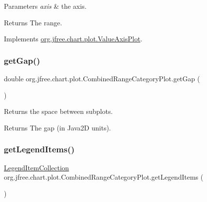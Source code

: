 \begin{DoxyParams}{Parameters}
{\em axis} & the axis.\\
\hline
\end{DoxyParams}
\begin{DoxyReturn}{Returns}
The range. 
\end{DoxyReturn}


Implements \mbox{\hyperlink{interfaceorg_1_1jfree_1_1chart_1_1plot_1_1_value_axis_plot_a54815b2f078c11b2618804fe3e7e5353}{org.\+jfree.\+chart.\+plot.\+Value\+Axis\+Plot}}.

\mbox{\label{classorg_1_1jfree_1_1chart_1_1plot_1_1_combined_range_category_plot_a5e987ea289d17c1e4a86ee61f178a53d}} 
\subsubsection{\texorpdfstring{get\+Gap()}{getGap()}}
{\footnotesize\ttfamily double org.\+jfree.\+chart.\+plot.\+Combined\+Range\+Category\+Plot.\+get\+Gap (\begin{DoxyParamCaption}{ }\end{DoxyParamCaption})}

Returns the space between subplots.

\begin{DoxyReturn}{Returns}
The gap (in Java2D units). 
\end{DoxyReturn}
\mbox{\label{classorg_1_1jfree_1_1chart_1_1plot_1_1_combined_range_category_plot_a37a115625695a3f6781d7d57e9eb9ac2}} 
\subsubsection{\texorpdfstring{get\+Legend\+Items()}{getLegendItems()}}
{\footnotesize\ttfamily \mbox{\hyperlink{classorg_1_1jfree_1_1chart_1_1_legend_item_collection}{Legend\+Item\+Collection}} org.\+jfree.\+chart.\+plot.\+Combined\+Range\+Category\+Plot.\+get\+Legend\+Items (\begin{DoxyParamCaption}{ }\end{DoxyParamCaption})}

